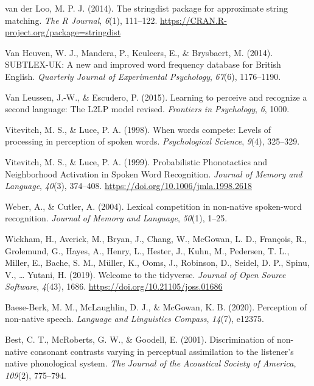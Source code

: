 \documentclass[
]{article}
\newlength{\cslhangindent}
\newenvironment{CSLReferences}[2] %
 {\begin{list}{}{%
  \setlength{\itemindent}{0pt}
  \setlength{\leftmargin}{0pt}
  \setlength{\parsep}{0pt}
  \ifodd #1
   \setlength{\leftmargin}{\cslhangindent}
   \setlength{\itemindent}{-1\cslhangindent}
  \fi
  \setlength{\itemsep}{#2\baselineskip}}}
 {\end{list}}
\begin{document}
\begin{CSLReferences}{1}{0}
van der Loo, M. P. J. (2014). The stringdist package for approximate
string matching. \emph{The R Journal}, \emph{6}(1), 111--122.
\url{https://CRAN.R-project.org/package=stringdist}

Van Heuven, W. J., Mandera, P., Keuleers, E., \& Brysbaert, M. (2014).
{SUBTLEX-UK}: {A} new and improved word frequency database for {British
English}. \emph{Quarterly Journal of Experimental Psychology},
\emph{67}(6), 1176--1190.

Van Leussen, J.-W., \& Escudero, P. (2015). Learning to perceive and
recognize a second language: The L2LP model revised. \emph{Frontiers in
Psychology}, \emph{6}, 1000.

Vitevitch, M. S., \& Luce, P. A. (1998). When words compete: Levels of
processing in perception of spoken words. \emph{Psychological Science},
\emph{9}(4), 325--329.

Vitevitch, M. S., \& Luce, P. A. (1999). Probabilistic {Phonotactics}
and {Neighborhood Activation} in {Spoken Word Recognition}.
\emph{Journal of Memory and Language}, \emph{40}(3), 374--408.
\url{https://doi.org/10.1006/jmla.1998.2618}

Weber, A., \& Cutler, A. (2004). Lexical competition in non-native
spoken-word recognition. \emph{Journal of Memory and Language},
\emph{50}(1), 1--25.

Wickham, H., Averick, M., Bryan, J., Chang, W., McGowan, L. D.,
François, R., Grolemund, G., Hayes, A., Henry, L., Hester, J., Kuhn, M.,
Pedersen, T. L., Miller, E., Bache, S. M., Müller, K., Ooms, J.,
Robinson, D., Seidel, D. P., Spinu, V., \ldots{} Yutani, H. (2019).
Welcome to the tidyverse. \emph{Journal of Open Source Software},
\emph{4}(43), 1686. \url{https://doi.org/10.21105/joss.01686}

Baese-Berk, M. M., McLaughlin, D. J., \& McGowan, K. B. (2020).
Perception of non-native speech. \emph{Language and Linguistics
Compass}, \emph{14}(7), e12375.

Best, C. T., McRoberts, G. W., \& Goodell, E. (2001). Discrimination of
non-native consonant contrasts varying in perceptual assimilation to the
listener's native phonological system. \emph{The Journal of the
Acoustical Society of America}, \emph{109}(2), 775--794.


\end{CSLReferences}
\end{document}
